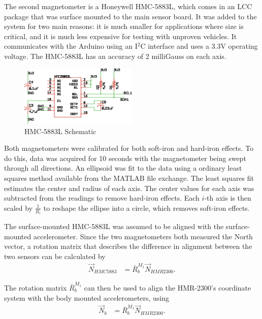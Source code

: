  The second magnetometer is a Honeywell HMC-5883L, which comes in an LCC package that was surface mounted to the main sensor board. It was added to the system for two main reasons: it is much smaller for applications where size is critical, and it is much less expensive for testing with unproven vehicles. It communicates with the Arduino using an I$^2$C interface and uses a 3.3V operating voltage\cite{hmc5883LDatasheet}. The HMC-5883L has an accuracy of 2 milliGauss on each axis. 
 
 \begin{figure}[H]

   \centering
     \includegraphics[width=0.5\textwidth]{figures/hmc5883LSchematic.eps}
        \caption{HMC-5883L Schematic} \label{hmc5883LSchematic}
 \end{figure}

 Both magnetometers were calibrated for both soft-iron and hard-iron effects\cite{magCalibration}. To do this, data was acquired for 10 seconds with the magnetometer being swept through all directions. An ellipsoid was fit to the data using a ordinary least squares method available from the MATLAB file exchange\cite{ellipsoidFit}.
 The least squares fit estimates the center and radius of each axis. The center values for each axis was subtracted from the readings to remove hard-iron effects. Each $i$-th axis is then scaled by $\frac{1}{R_i}$ to reshape the ellipse into a circle, which removes soft-iron effects.
 
 The surface-mounted HMC-5883L was assumed to be aligned with the surface-mounted accelerometer. Since the two magnetometers both measured the North vector, a rotation matrix that describes the difference in alignment between the two sensors can be calculated by
 \begin{align}
\vec{N}_{HMC5883} &= \bar{R}^{M_1}_b\vec{N}_{HMR2300}.
 \end{align}
 
 The rotation matrix $\bar{R}^{M_1}_b$ can then be used to align the HMR-2300's coordinate system with the body mounted accelerometers, using
 \begin{align}
\vec{N}_b &= \bar{R}^{M_1}_b\vec{N}_{HMR2300}.
 \end{align}
 
